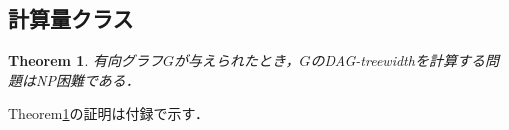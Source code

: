 \documentclass[master]{kuisthesis}		%
\theoremstyle{plain}
\newtheorem{theorem}{Theorem}
\newtheorem{lemma}{Lemma}
\theoremstyle{definition}
\begin{document}
\subsection{計算量クラス}

\begin{theorem}\label{NP困難}
    有向グラフ$G$が与えられたとき，$G$のDAG-treewidthを計算する問題はNP困難である．
\end{theorem}

Theorem\ref{NP困難}の証明は付録で示す．

\end{document}
